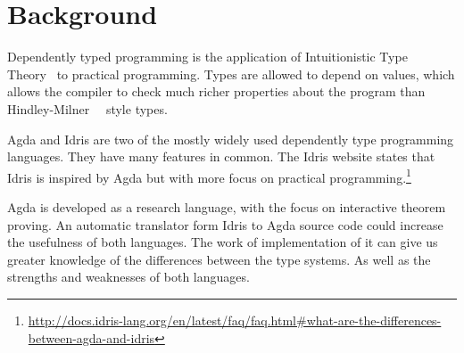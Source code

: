 \documentclass[parskip=half]{scrartcl}
\begin{document}




\section{Background}

Dependently typed programming is the application of
Intuitionistic Type Theory~\cite{martinlof} to practical programming.  Types
are allowed to depend on values, which allows the compiler to check much richer
properties about the program than Hindley-Milner~\cite{hindley}~\cite{milner}
style types.

Agda and Idris are two of the mostly widely used dependently type programming
languages. They have many features in common. The Idris website states that
Idris is inspired by Agda but with more focus on practical
programming.\footnote{\url{http://docs.idris-lang.org/en/latest/faq/faq.html\#what-are-the-differences-between-agda-and-idris}}

Agda is developed as a research language, with the focus on interactive theorem
proving.  An automatic translator form Idris to Agda source code could increase
the usefulness of both languages. The work of implementation of it can give us
greater knowledge of the differences between the type systems. As well as the
strengths and weaknesses of both languages.
\end{document}
